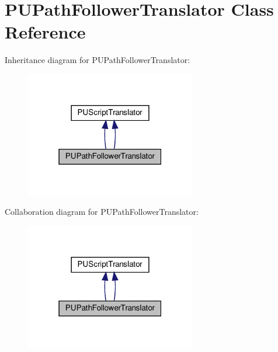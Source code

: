 \hypertarget{classPUPathFollowerTranslator}{}\section{P\+U\+Path\+Follower\+Translator Class Reference}
\label{classPUPathFollowerTranslator}


Inheritance diagram for P\+U\+Path\+Follower\+Translator\+:
\nopagebreak
\begin{figure}[H]
\begin{center}
\leavevmode
\includegraphics[width=211pt]{classPUPathFollowerTranslator__inherit__graph}
\end{center}
\end{figure}


Collaboration diagram for P\+U\+Path\+Follower\+Translator\+:
\nopagebreak
\begin{figure}[H]
\begin{center}
\leavevmode
\includegraphics[width=211pt]{classPUPathFollowerTranslator__coll__graph}
\end{center}
\end{figure}
